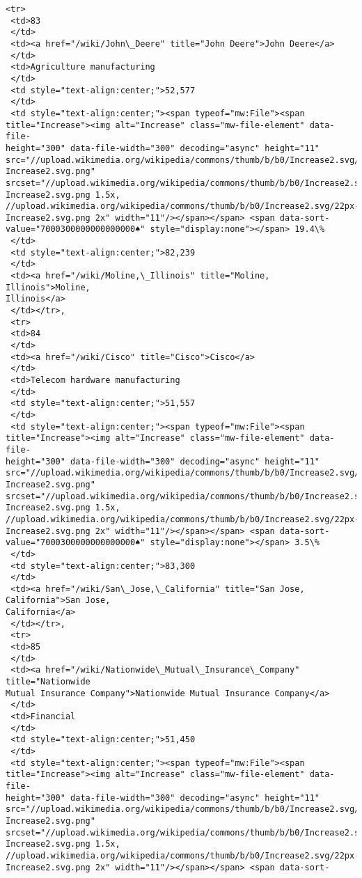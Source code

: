 \documentclass[11pt]{article}
\begin{document}
\begin{tcolorbox}[breakable, size=fbox, boxrule=.5pt, pad at break*=1mm, opacityfill=0]
\begin{Verbatim}[commandchars=\\\{\}]
 <tr>
 <td>83
 </td>
 <td><a href="/wiki/John\_Deere" title="John Deere">John Deere</a>
 </td>
 <td>Agriculture manufacturing
 </td>
 <td style="text-align:center;">52,577
 </td>
 <td style="text-align:center;"><span typeof="mw:File"><span
title="Increase"><img alt="Increase" class="mw-file-element" data-file-
height="300" data-file-width="300" decoding="async" height="11"
src="//upload.wikimedia.org/wikipedia/commons/thumb/b/b0/Increase2.svg/11px-
Increase2.svg.png"
srcset="//upload.wikimedia.org/wikipedia/commons/thumb/b/b0/Increase2.svg/17px-
Increase2.svg.png 1.5x,
//upload.wikimedia.org/wikipedia/commons/thumb/b/b0/Increase2.svg/22px-
Increase2.svg.png 2x" width="11"/></span></span> <span data-sort-
value="7000300000000000000♠" style="display:none"></span> 19.4\%
 </td>
 <td style="text-align:center;">82,239
 </td>
 <td><a href="/wiki/Moline,\_Illinois" title="Moline, Illinois">Moline,
Illinois</a>
 </td></tr>,
 <tr>
 <td>84
 </td>
 <td><a href="/wiki/Cisco" title="Cisco">Cisco</a>
 </td>
 <td>Telecom hardware manufacturing
 </td>
 <td style="text-align:center;">51,557
 </td>
 <td style="text-align:center;"><span typeof="mw:File"><span
title="Increase"><img alt="Increase" class="mw-file-element" data-file-
height="300" data-file-width="300" decoding="async" height="11"
src="//upload.wikimedia.org/wikipedia/commons/thumb/b/b0/Increase2.svg/11px-
Increase2.svg.png"
srcset="//upload.wikimedia.org/wikipedia/commons/thumb/b/b0/Increase2.svg/17px-
Increase2.svg.png 1.5x,
//upload.wikimedia.org/wikipedia/commons/thumb/b/b0/Increase2.svg/22px-
Increase2.svg.png 2x" width="11"/></span></span> <span data-sort-
value="7000300000000000000♠" style="display:none"></span> 3.5\%
 </td>
 <td style="text-align:center;">83,300
 </td>
 <td><a href="/wiki/San\_Jose,\_California" title="San Jose, California">San Jose,
California</a>
 </td></tr>,
 <tr>
 <td>85
 </td>
 <td><a href="/wiki/Nationwide\_Mutual\_Insurance\_Company" title="Nationwide
Mutual Insurance Company">Nationwide Mutual Insurance Company</a>
 </td>
 <td>Financial
 </td>
 <td style="text-align:center;">51,450
 </td>
 <td style="text-align:center;"><span typeof="mw:File"><span
title="Increase"><img alt="Increase" class="mw-file-element" data-file-
height="300" data-file-width="300" decoding="async" height="11"
src="//upload.wikimedia.org/wikipedia/commons/thumb/b/b0/Increase2.svg/11px-
Increase2.svg.png"
srcset="//upload.wikimedia.org/wikipedia/commons/thumb/b/b0/Increase2.svg/17px-
Increase2.svg.png 1.5x,
//upload.wikimedia.org/wikipedia/commons/thumb/b/b0/Increase2.svg/22px-
Increase2.svg.png 2x" width="11"/></span></span> <span data-sort-

\end{Verbatim}
\end{tcolorbox}
\end{document}
